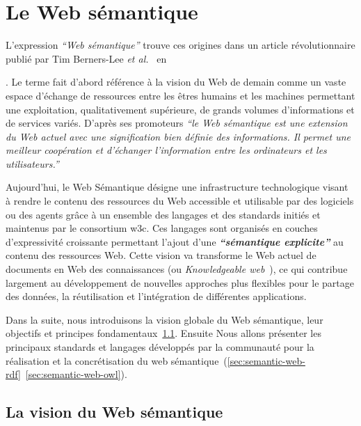 \chapter{Le Web sémantique}
\label{annexe:semantic-web}


L'expression \emph{``Web sémantique''} trouve ces origines dans un
article révolutionnaire publié par Tim Berners-Lee \emph{et
  al.}~\cite{berners2001semantic} en \date{2001}. Le terme fait
d'abord référence à la vision du Web de demain comme un vaste espace
d'échange de ressources entre les êtres humains et les machines
permettant une exploitation, qualitativement supérieure, de grands
volumes d'informations et de services variés. D'après ses promoteurs
\emph{``le Web sémantique est une extension du Web actuel avec une
  signification bien définie des informations. Il permet une meilleur
  coopération et d'échanger l'information entre les ordinateurs et les
  utilisateurs.''}\medskip

Aujourd'hui, le Web Sémantique désigne une infrastructure
technologique visant à rendre le contenu des ressources du Web
accessible et utilisable par des logiciels ou des agents grâce à un
ensemble des langages et des standards initiés et maintenus par le
consortium \acrshort{w3c}. Ces langages sont organisés en couches
d'expressivité croissante permettant l'ajout d'une
\emph{\textbf{``sémantique explicite''}} au contenu des ressources
Web. Cette vision va transforme le Web actuel de documents en Web des
connaissances (ou \emph{Knowledgeable web}~\cite{decker2000semantic}),
ce qui contribue largement au développement de nouvelles approches
plus flexibles pour le partage des données, la réutilisation et
l'intégration de différentes applications.\medskip

Dans la suite, nous introduisons la vision globale du Web sémantique,
leur objectifs et principes
fondamentaux~\ref{sec:semantic-web-vision}. Ensuite Nous allons
présenter les principaux standards et langages développés par la
communauté pour la réalisation et la concrétisation du web
sémantique~(\ref{sec:semantic-web-rdf}~\ref{sec:semantic-web-owl}).

\newpage
\section{La vision du Web sémantique}
\label{sec:semantic-web-vision}


